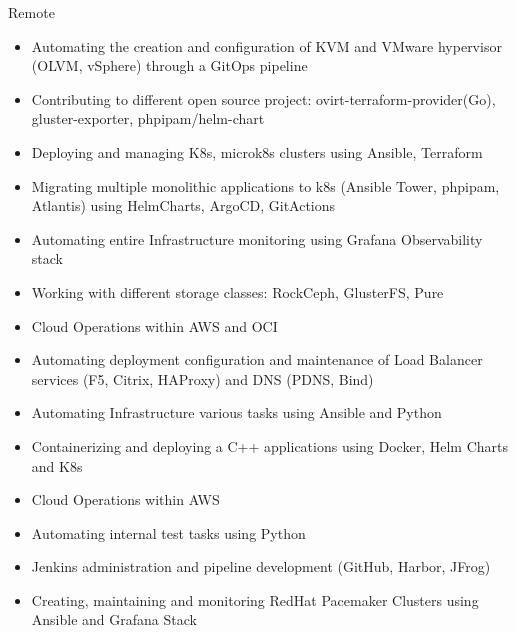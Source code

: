 \documentclass[10pt,a4paper,ragged2e,withhyper]{altacv}
\begin{document}


\makecvheader


\begin{paracol}{2}

{Remote}
\begin{itemize}
\item Automating the creation and configuration of KVM and VMware hypervisor (OLVM, vSphere) through a GitOps pipeline
\item Contributing to different open source project: ovirt-terraform-provider(Go), gluster-exporter, phpipam/helm-chart
\item Deploying and managing K8s, microk8s clusters using Ansible, Terraform 
\item Migrating multiple monolithic applications to k8s (Ansible Tower, phpipam, Atlantis) using HelmCharts, ArgoCD, GitActions
\item Automating entire Infrastructure monitoring using Grafana \newline Observability stack
\item Working with different storage classes: RockCeph, GlusterFS, Pure
\item Cloud Operations within AWS and OCI
\item Automating deployment configuration and maintenance of Load Balancer services (F5, Citrix, HAProxy) and DNS (PDNS, Bind)
\item Automating Infrastructure various tasks using Ansible and Python
\end{itemize}
\divider
{}
\begin{itemize}
\item Containerizing and deploying a C++ applications using Docker, Helm Charts and K8s
\item Cloud Operations within AWS
\item Automating internal test tasks using Python
\item Jenkins administration and pipeline development (GitHub, \newline Harbor, JFrog)
\item Creating, maintaining and monitoring RedHat Pacemaker \newline Clusters using Ansible and Grafana Stack
\end{itemize}


\end{paracol}
\end{document}
